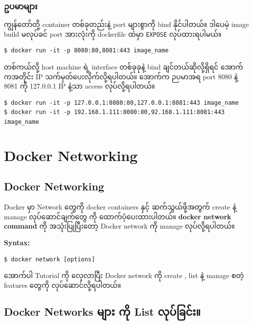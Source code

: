 \subsubsection{ဥပမာများ}\label{ux1025ux1015ux1019ux1019}

ကျွန်တော်တို့ container တစ်ခုတည်းနဲ့ port များစွာကို bind နိုင်ပါတယ်။
ဒါပေမဲ့ image build မလုပ်ခင် port အားလုံးကို dockerfile ထဲမှာ
\texttt{EXPOSE} လုပ်ထားရပါမယ်။

\begin{verbatim}
$ docker run -it -p 8080:80,8081:443 image_name
\end{verbatim}

တစ်ကယ်လို့ host machine ရဲ့ interface တစ်ခုခုနဲ့ bind
ချင်တယ်ဆိုလို့ရှိရင် အောက်ကအတိုင်း IP သက်မှတ်ပေးလိုက်လို့ရပါတယ်။ အောက်က
ဉပမာအရ port 8080 နဲ့ 8081 ကို 127.0.0.1 IP နဲ့သာ access လုပ်လို့ရပါတယ်။

\begin{verbatim}
$ docker run -it -p 127.0.0.1:8080:80,127.0.0.1:8081:443 image_name
$ docker run -it -p 192.168.1.111:8080:80,92.168.1.111:8081:443 image_name
\end{verbatim}

\pagebreak

\section{Docker Networking}\label{docker-networking}

\subsection{Docker Networking}\label{docker-networking-1}

Docker မှာ Network တွေကို docker containers နှင့် ဆက်သွယ်ဖို့အတွက်
create နဲ့ manage လုပ်ဆောင်ချက်တွေ ကို ထောက်ပံ့ပေးထားပါတယ်။
\textbf{docker network command} ကို အသုံးပြုပြီးတော့ Docker network ကို
manage လုပ်လို့ရပါတယ်။

\textbf{Syntax:}

\begin{verbatim}
$ docker network [options]
\end{verbatim}

အောက်ပါ Tutorial ကို လေ့လာပြီး Docker network ကို create , list နဲ့
manage စတဲ့ features တွေကို လုပ်ဆောင်လို့ရပါတယ်။

\subsection{Docker Networks များ ကို List
လုပ်ခြင်း။}\label{docker-networks---list-}

